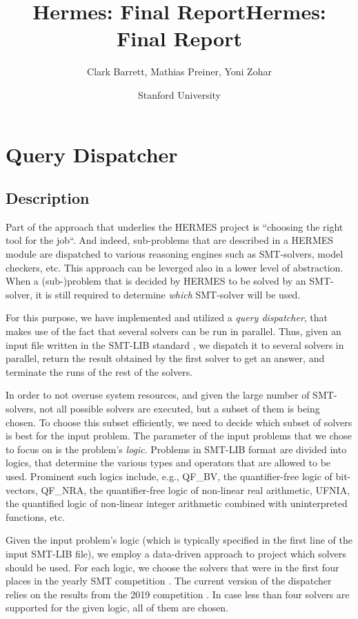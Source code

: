 \documentclass{article}
\title{Hermes: Final Report}
\title{Hermes: Final Report}
\author{Clark Barrett, Mathias Preiner, Yoni Zohar
\date{Stanford University}}
\begin{document}
\maketitle

\section{Query Dispatcher}
\subsection{Description}
Part of the approach that underlies the HERMES project is
``choosing the right tool for the job``.
And indeed, sub-problems that are described in
a HERMES module are dispatched to various
reasoning engines such as SMT-solvers, model checkers, etc.
This approach can be leverged also in a lower level of abstraction.
When a (sub-)problem that is decided by HERMES to be solved by an SMT-solver, it is still
required to determine \emph{which} SMT-solver will be used.

For this purpose, we have implemented and utilized a
{\em query dispatcher}, that
makes use of the fact that several solvers
can be run in parallel.
Thus, given an input file written in the SMT-LIB standard \cite{SMTLib2010}, we dispatch it to several solvers in parallel,
return the result obtained by the first solver to get an answer, and
terminate the runs of the rest of the solvers.

In order to not overuse system resources, and given the large number of SMT-solvers,
not all possible solvers are executed, but a subset of them is being chosen.
To choose this subset efficiently, we need to decide which subset of solvers is best
for the input problem.
The parameter of the input problems that we chose to focus on is the problem's {\em logic}.
Problems in SMT-LIB format are divided into logics, that determine the various types and operators
that are allowed to be used.
Prominent such logics include, e.g.,
QF\_BV, the quantifier-free logic of bit-vectors,
QF\_NRA, the quantifier-free logic of non-linear real arithmetic,
UFNIA, the quantified logic of non-linear integer arithmetic combined with uninterpreted functions, etc.

Given the input problem's logic (which is typically specified in the first line of
the input SMT-LIB file), we employ a data-driven approach to project which solvers should be used.
For each logic, we choose the solvers that were in the first four places in
the yearly SMT competition \cite{DBLP:journals/jsat/WeberCDHNR19}.
The current version of the dispatcher relies on the results from the 2019 competition \cite{smtcomp2019}.
In case less than four solvers are supported for the given logic, all of them are chosen.
\end{document}
